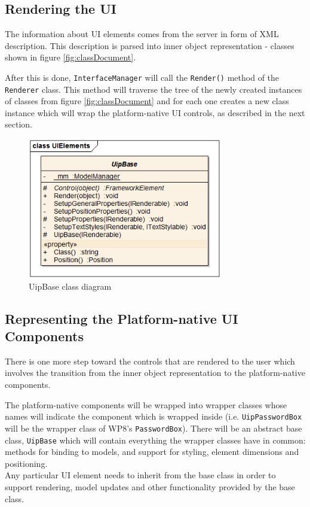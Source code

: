 \subsection{Rendering the UI}
The information about UI elements comes from the server in form of XML description. This description is parsed into inner object representation - classes shown in figure \ref{fig:classDocument}. 

After this is done, \texttt{InterfaceManager} will call the \texttt{Render()} method of the \texttt{Renderer} class. This method will traverse the tree of the newly created instances of classes from figure \ref{fig:classDocument} and for each one creates a new class instance which will wrap the platform-native UI controls, as described in the next section.

\begin{figure}[ht!]
\centering
\includegraphics[width=85mm]{pics/3/classUipBase.png}
\caption{UipBase class diagram}
\label{fig:classUipBase}
\end{figure}

\subsection{Representing the Platform-native UI Components}
There is one more step toward the controls that are rendered to the user which involves the transition from the inner object representation to the platform-native components.

The platform-native components will be wrapped into wrapper classes whose names will indicate the component which is wrapped inside (i.e. \texttt{UipPasswordBox} will be the wrapper class of WP8's \texttt{PasswordBox}). There will be an abstract base class, \texttt{UipBase} which will contain everything the wrapper classes have in common: methods for binding to models, and support for styling, element dimensions and positioning.\\
Any particular UI element needs to inherit from the base class in order to support rendering, model updates and other functionality provided by the base class.

